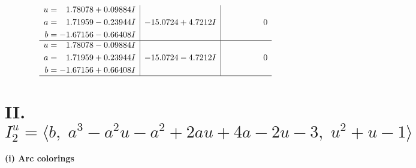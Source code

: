 \documentclass[1p]{elsarticle_modified}
\theoremstyle{definition}
\begin{document}
$$\begin{array}{c|c|c}
\begin{aligned}
u &= \phantom{-}1.78078 + 0.09884 I \\
a &= \phantom{-}1.71959 - 0.23944 I \\
b &= -1.67156 - 0.66408 I\end{aligned}
 & -15.0724 + 4.7212 I & \phantom{-0.000000 } 0 \\ \hline\begin{aligned}
u &= \phantom{-}1.78078 - 0.09884 I \\
a &= \phantom{-}1.71959 + 0.23944 I \\
b &= -1.67156 + 0.66408 I\end{aligned}
 & -15.0724 - 4.7212 I & \phantom{-0.000000 } 0\\
 \hline 
 \end{array}$$\newpage\newpage\renewcommand{\arraystretch}{1}
\centering \section*{II. $I^u_{2}= \langle b,\;a^3- a^2 u- a^2+2 a u+4 a-2 u-3,\;u^2+u-1 \rangle$}
\flushleft \textbf{(i) Arc colorings}\\
\end{document}
